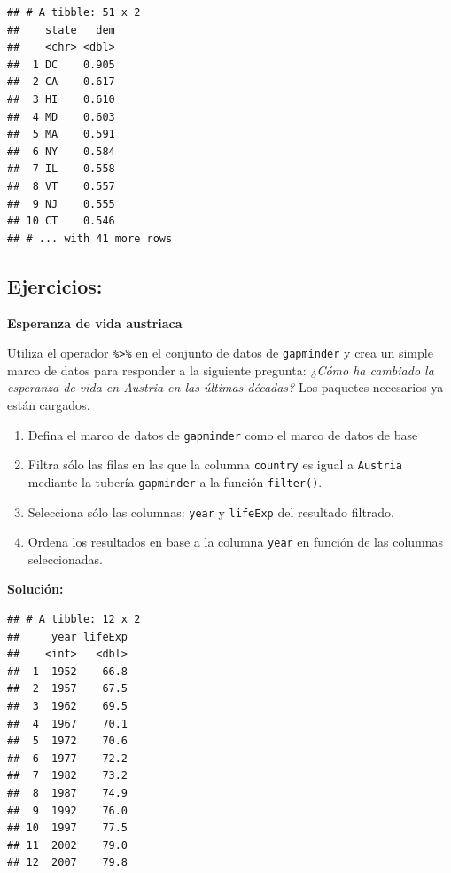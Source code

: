 \documentclass[
]{book}
\newenvironment{Shaded}{\begin{snugshade}}{\end{snugshade}}
\newcommand{\KeywordTok}[1]{\textcolor[rgb]{0.13,0.29,0.53}{\textbf{#1}}}
\newcommand{\NormalTok}[1]{#1}
\newcommand{\OperatorTok}[1]{\textcolor[rgb]{0.81,0.36,0.00}{\textbf{#1}}}
\newcommand{\StringTok}[1]{\textcolor[rgb]{0.31,0.60,0.02}{#1}}
\providecommand{\tightlist}{%
  \setlength{\itemsep}{0pt}\setlength{\parskip}{0pt}}
\begin{document}
\begin{verbatim}
## # A tibble: 51 x 2
##    state   dem
##    <chr> <dbl>
##  1 DC    0.905
##  2 CA    0.617
##  3 HI    0.610
##  4 MD    0.603
##  5 MA    0.591
##  6 NY    0.584
##  7 IL    0.558
##  8 VT    0.557
##  9 NJ    0.555
## 10 CT    0.546
## # ... with 41 more rows
\end{verbatim}

\hypertarget{ejercicios}{%
\subsection{Ejercicios:}\label{ejercicios}}

\textbf{Esperanza de vida austriaca}

Utiliza el operador \texttt{\%\textgreater{}\%} en el conjunto de datos de \texttt{gapminder} y crea un simple marco de datos para responder a la siguiente pregunta: \emph{¿Cómo ha cambiado la esperanza de vida en Austria en las últimas décadas?} Los paquetes necesarios ya están cargados.

\begin{enumerate}
\def\labelenumi{\arabic{enumi}.}
\tightlist
\item
  Defina el marco de datos de \texttt{gapminder} como el marco de datos de base
\item
  Filtra sólo las filas en las que la columna \texttt{country} es igual a \texttt{Austria} mediante la tubería \texttt{gapminder} a la función \texttt{filter()}.
\item
  Selecciona sólo las columnas: \texttt{year} y \texttt{lifeExp} del resultado filtrado.
\item
  Ordena los resultados en base a la columna \texttt{year} en función de las columnas seleccionadas.
\end{enumerate}

\textbf{Solución:}

\begin{Shaded}
\end{Shaded}

\begin{verbatim}
## # A tibble: 12 x 2
##     year lifeExp
##    <int>   <dbl>
##  1  1952    66.8
##  2  1957    67.5
##  3  1962    69.5
##  4  1967    70.1
##  5  1972    70.6
##  6  1977    72.2
##  7  1982    73.2
##  8  1987    74.9
##  9  1992    76.0
## 10  1997    77.5
## 11  2002    79.0
## 12  2007    79.8
\end{verbatim}
\end{document}
